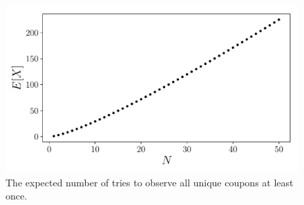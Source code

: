 \begin{problem}{21}
\begin{enumerate}
	\begin{figure}[t]
	\centering
      		 \includegraphics[totalheight=6cm]{chpt3/prob21.pdf}
  			  \caption{The expected number of tries to observe all unique coupons at least once.}
    			   \label{fig:prob_21}
	\end{figure}



\end{enumerate}

\end{problem}

